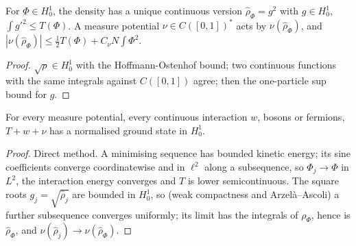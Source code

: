 \begin{theorem}
  \label{thm:line_measureN}
  \leanok
  For $\Phi\in H^1_0$, the density has a unique continuous version $\hat\rho_\Phi=g^2$ with $g\in H^1_0$, $\int g'^2\le T(\Phi)$. A measure
  potential $\nu\in C([0,1])^*$ acts by $\nu(\hat\rho_\Phi)$, and $|\nu(\hat\rho_\Phi)|\le\frac12T(\Phi)+C_\nu N\int\Phi^2$.
\end{theorem}
\begin{proof}
  \leanok
  $\sqrt\rho\in H^1_0$ with the Hoffmann-Ostenhof bound; two continuous functions with the same integrals against $C([0,1])$
  agree; then the one-particle sup bound for $g$.
\end{proof}

\begin{theorem}
  \label{thm:line_measureN_gs}
  \leanok
  For every measure potential, every continuous interaction $w$, bosons or fermions, $T+w+\nu$ has a normalised ground
  state in $H^1_0$.
\end{theorem}
\begin{proof}
  \leanok
  Direct method. A minimising sequence has bounded kinetic energy; its sine coefficients converge coordinatewise and in
  $\ell^2$ along a subsequence, so $\Phi_j\to\Phi$ in $L^2$, the interaction energy converges and $T$ is lower semicontinuous.
  The square roots $g_j=\sqrt{\hat\rho_j}$ are bounded in $H^1_0$, so (weak compactness and Arzel\`a--Ascoli) a further
  subsequence converges uniformly; its limit has the integrals of $\rho_\Phi$, hence is $\hat\rho_\Phi$, and
  $\nu(\hat\rho_j)\to\nu(\hat\rho_\Phi)$.
\end{proof}


